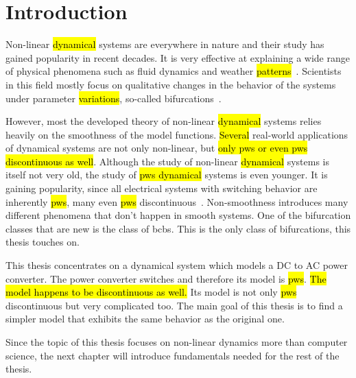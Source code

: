 \chapter{Introduction}
\label{chap:intro}

Non-linear \hl{dynamical} systems are everywhere in nature and their study has gained popularity in recent decades.
It is very effective at explaining a wide range of physical phenomena such as fluid dynamics and weather \hl{patterns}~\cite{bernardo2008piecewise}.
Scientists in this field mostly focus on qualitative changes in the behavior of the systems under parameter \hl{variations}, so-called bifurcations~\cite{simpson2010}.

However, most the developed theory of non-linear \hl{dynamical} systems relies heavily on the smoothness of the model functions.
\hl{Several} real-world applications of dynamical systems are not only non-linear, but \hl{only \gls{pws} or even \gls{pws} discontinuous as well}.
Although the study of non-linear \hl{dynamical} systems is itself not very old, the study of \hl{\gls{pws} dynamical} systems is even younger.
It is gaining popularity, since all electrical systems with switching behavior are inherently \hl{\gls{pws}}, many even \hl{\gls{pws}} discontinuous~\cite{simpson2010}.
Non-smoothness introduces many different phenomena that don't happen in smooth systems.
One of the bifurcation classes that are new is the class of \glspl{bcb}.
This is the only class of bifurcations, this thesis touches on.

This thesis concentrates on a dynamical system which models a DC to AC power converter.
The power converter switches and therefore its model is \hl{\gls{pws}}.
\hl{The model happens to be discontinuous as well.}
Its model is not only \hl{\gls{pws}} discontinuous but very complicated too.
The main goal of this thesis is to find a simpler model that exhibits the same behavior as the original one.

Since the topic of this thesis focuses on non-linear dynamics more than computer science, the next chapter will introduce fundamentals needed for the rest of the thesis.
